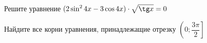 \begin{ex}
	\begin{condition}
		\begin{enumcols}[label=\asbuk*)]
			\item Решите уравнение \( (2\sin^2 4x - 3\cos 4x)\cdot \sqrt{\tg x} = 0 \)
			\item Найдите все корни уравнения, принадлежащие отрезку \(  \left(0;\dfrac{3\pi}{2}\right] \)
		\end{enumcols}
	\end{condition}
\end{ex}